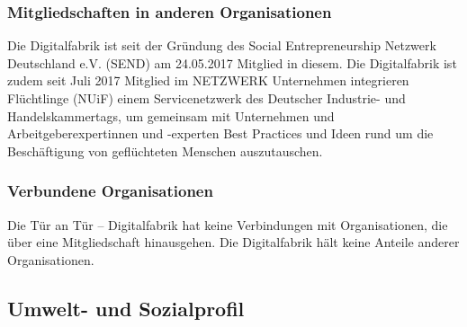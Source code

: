 \documentclass[12pt, a4paper]{article} %
\begin{document}
\hypertarget{mitgliedschaften-in-anderen-organisationen}{%
\subsubsection{Mitgliedschaften in anderen
Organisationen}\label{mitgliedschaften-in-anderen-organisationen}}

Die Digitalfabrik ist seit der Gründung des Social Entrepreneurship
Netzwerk Deutschland e.V. (SEND) am 24.05.2017 Mitglied in diesem. Die
Digitalfabrik ist zudem seit Juli 2017 Mitglied im NETZWERK Unternehmen
integrieren Flüchtlinge (NUiF) einem Servicenetzwerk des Deutscher
Industrie- und Handelskammertags, um gemeinsam mit Unternehmen und
Arbeitgeberexpertinnen und -experten Best Practices und Ideen rund um
die Beschäftigung von geflüchteten Menschen auszutauschen.

\hypertarget{verbundene-organisationen}{%
\subsubsection{Verbundene
Organisationen}\label{verbundene-organisationen}}

Die Tür an Tür – Digitalfabrik hat keine Verbindungen mit
Organisationen, die über eine Mitgliedschaft hinausgehen. Die
Digitalfabrik hält keine Anteile anderer Organisationen.

\hypertarget{umwelt--und-sozialprofil}{%
\subsection{Umwelt- und
Sozialprofil}\label{umwelt--und-sozialprofil}}
\end{document}
